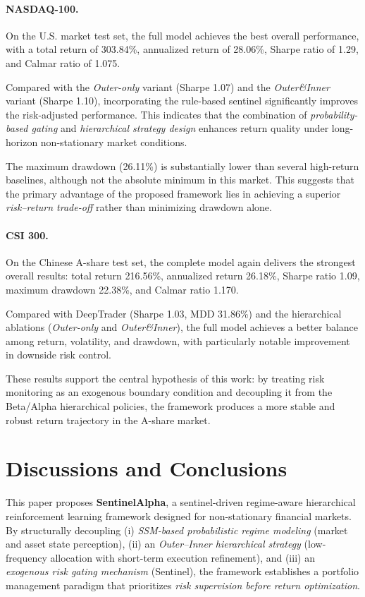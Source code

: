 \documentclass[letterpaper]{article} %
\begin{document}
\paragraph{NASDAQ-100.}
On the U.S. market test set, the full model achieves the best overall performance, with a total return of 303.84\%, annualized return of 28.06\%, Sharpe ratio of 1.29, and Calmar ratio of 1.075. 

Compared with the \textit{Outer-only} variant (Sharpe 1.07) and the \textit{Outer\&Inner} variant (Sharpe 1.10), incorporating the rule-based sentinel significantly improves the risk-adjusted performance. This indicates that the combination of \emph{probability-based gating} and \emph{hierarchical strategy design} enhances return quality under long-horizon non-stationary market conditions.

The maximum drawdown (26.11\%) is substantially lower than several high-return baselines, although not the absolute minimum in this market. This suggests that the primary advantage of the proposed framework lies in achieving a superior \emph{risk--return trade-off} rather than minimizing drawdown alone.
\paragraph{CSI 300.}
On the Chinese A-share test set, the complete model again delivers the strongest overall results: total return 216.56\%, annualized return 26.18\%, Sharpe ratio 1.09, maximum drawdown 22.38\%, and Calmar ratio 1.170. 

Compared with DeepTrader (Sharpe 1.03, MDD 31.86\%) and the hierarchical ablations (\textit{Outer-only} and \textit{Outer\&Inner}), the full model achieves a better balance among return, volatility, and drawdown, with particularly notable improvement in downside risk control.

These results support the central hypothesis of this work: by treating risk monitoring as an exogenous boundary condition and decoupling it from the Beta/Alpha hierarchical policies, the framework produces a more stable and robust return trajectory in the A-share market.

\section{Discussions and Conclusions}
This paper proposes \textbf{SentinelAlpha}, a sentinel-driven regime-aware hierarchical reinforcement learning framework designed for non-stationary financial markets. By structurally decoupling 
(i) \emph{SSM-based probabilistic regime modeling} (market and asset state perception), 
(ii) an \emph{Outer--Inner hierarchical strategy} (low-frequency allocation with short-term execution refinement), and 
(iii) an \emph{exogenous risk gating mechanism} (Sentinel), 
the framework establishes a portfolio management paradigm that prioritizes \emph{risk supervision before return optimization}.
\end{document}
